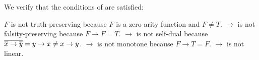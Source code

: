 \begin{example}
\begin{ExEnum}
    We verify that the conditions of  are satisfied:
    \begin{RefList}
       \( F \) is not truth-preserving because \( F \) is a zero-arity function and \( F \neq T \).
       \( \rightarrow \) is not falsity-preserving because \( F \rightarrow F = T \).
       \( \rightarrow \) is not self-dual because \( \overline{\overline{x} \rightarrow \overline{y}} = y \rightarrow x \neq x \rightarrow y \).
       \( \rightarrow \) is not monotone because \( F \rightarrow T = F \).
       \( \rightarrow \) is not linear.
    \end{RefList}
  \end{ExEnum}
\end{example}

